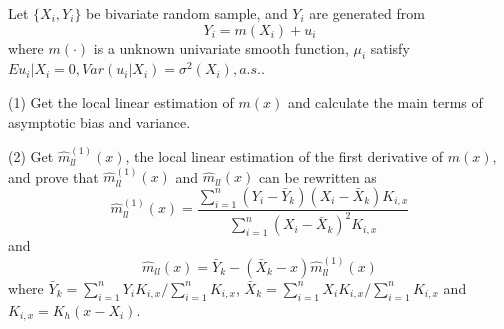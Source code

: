 \begin{problem}[HW 14.1]
    Let $\{ X_i, Y_i \}$ be bivariate random sample, and $Y_i$ are generated from 
    \begin{equation*}
        Y_i=m(X_i)+u_i
    \end{equation*}
    where $m(\cdot)$ is a unknown univariate smooth function, $\mu_i$ satisfy $Eu_i|X_i=0, Var(u_i|X_i)=\sigma^2(X_i), a.s.$.

    (1) Get the local linear estimation of $m(x)$ and calculate the main terms of asymptotic bias and variance.

    (2) Get $\hat{m}^{(1)}_{ll}(x)$, the local linear estimation of the first derivative of $m(x)$, and prove that $\hat{m}^{(1)}_{ll}(x)$ and $\hat{m}_{ll}(x)$ can be rewritten as 
    \begin{equation*}
        \hat{m}^{(1)}_{ll}(x)=\frac{\sum_{i=1}^n(Y_i-\bar{Y}_k)(X_i-\bar{X}_k)K_{i,x}}{\sum_{i=1}^n(X_i-\bar{X}_k)^2K_{i,x}}
    \end{equation*}
    and
    \begin{equation*}
        \hat{m}_{ll}(x)=\bar{Y}_k-(\bar{X}_k-x)\hat{m}^{(1)}_{ll}(x)
    \end{equation*}
    where $\bar{Y}_k=\sum_{i=1}^nY_iK_{i,x}/\sum_{i=1}^nK_{i,x}$, $\bar{X}_k=\sum_{i=1}^nX_iK_{i,x}/\sum_{i=1}^nK_{i,x}$ and $K_{i,x}=K_h(x-X_i)$.
\end{problem}

